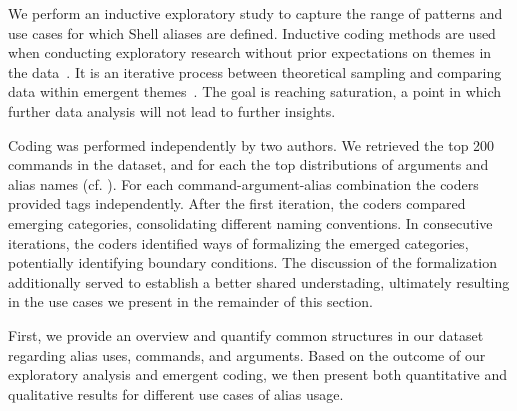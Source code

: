 We perform an inductive exploratory study to capture the range of patterns and use cases for which Shell aliases are defined. 
Inductive coding methods are used when conducting exploratory research without prior expectations on themes in the data~\cite{thomas:06}. It is an iterative process between theoretical sampling and comparing data within emergent themes~\cite{dey:03}. The goal is reaching saturation, a point in which further data analysis will not lead to further insights. 

Coding was performed independently by two authors.
We retrieved the top 200 commands in the dataset, and for each the top distributions of arguments and alias names (cf. ).
For each command-argument-alias combination the coders provided tags independently.
After the first iteration, the coders compared emerging categories, consolidating different naming conventions.
In consecutive iterations, the coders identified ways of formalizing the emerged categories, potentially identifying boundary conditions.
The discussion of the formalization additionally served to establish a better shared understading, ultimately resulting in the use cases we present in the remainder of this section.

First, we provide an overview and quantify common structures in our dataset regarding alias uses, commands, and arguments.
Based on the outcome of our exploratory analysis and emergent coding, we then present both quantitative and qualitative results for different use cases of alias usage.


% 


